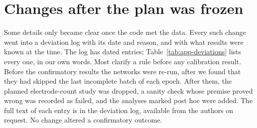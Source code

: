 \section{Changes after the plan was frozen}

Some details only became clear once the code met the data. Every such change went into a
deviation log with its date and reason, and with what results were known at the time. The log
has \nDeviations{} dated entries; Table~\ref{tab:app-deviations}
lists every one, in our own words. Most clarify a rule before any calibration result. Before the confirmatory results the
networks were re-run, after we found that they had skipped the last incomplete batch of each
epoch. After them, the planned electrode-count study was dropped, a sanity check whose premise
proved wrong was recorded as failed, and the analyses marked post hoc were added. The full text
of each entry is in the deviation log, available from the authors on request. No change altered
a confirmatory outcome.

